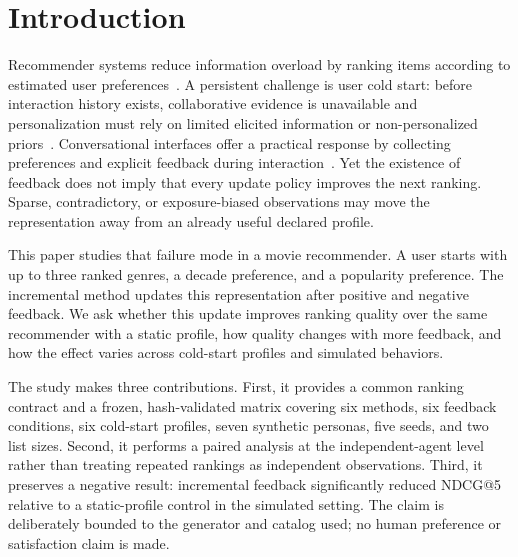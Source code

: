 \documentclass[sigconf,anonymous,review,natbib=false]{acmart}
\begin{document}


\maketitle

\section{Introduction}

Recommender systems reduce information overload by ranking items according to
estimated user preferences~\cite{ricci2015recommender}. A persistent challenge
is user cold start: before interaction history exists, collaborative evidence
is unavailable and personalization must rely on limited elicited information
or non-personalized priors~\cite{schein2002methods}. Conversational interfaces
offer a practical response by collecting preferences and explicit feedback
during interaction~\cite{jannach2021survey}. Yet the existence of feedback does
not imply that every update policy improves the next ranking. Sparse,
contradictory, or exposure-biased observations may move the representation away
from an already useful declared profile.

This paper studies that failure mode in a movie recommender. A user starts with
up to three ranked genres, a decade preference, and a popularity preference.
The incremental method updates this representation after positive and negative
feedback. We ask whether this update improves ranking quality over the same
recommender with a static profile, how quality changes with more feedback, and
how the effect varies across cold-start profiles and simulated behaviors.

The study makes three contributions. First, it provides a common ranking
contract and a frozen, hash-validated matrix covering six methods, six feedback
conditions, six cold-start profiles, seven synthetic personas, five seeds, and
two list sizes. Second, it performs a paired analysis at the independent-agent
level rather than treating repeated rankings as independent observations.
Third, it preserves a negative result: incremental feedback significantly
reduced NDCG@5 relative to a static-profile control in the simulated setting.
The claim is deliberately bounded to the generator and catalog used; no human
preference or satisfaction claim is made.
\end{document}
